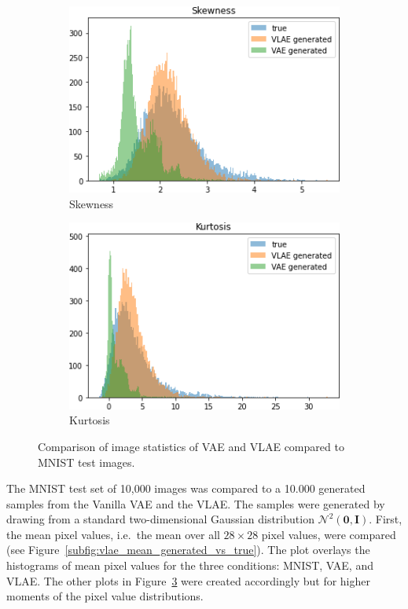 \begin{figure}
\begin{subfigure}{0.4\textwidth}
        \includegraphics[width=\textwidth]{images/vlae_generated_vs_true/mnist_vs_vlae_skew.png}
        \caption{Skewness}
        \label{subfig:vae_skew_generated_vs_true}
    \end{subfigure}
    \hfill
    \begin{subfigure}{0.4\textwidth}
        \centering
        \includegraphics[width=\textwidth]{images/vlae_generated_vs_true/mnist_vs_vlae_kurt.png}
        \caption{Kurtosis}
        \label{subfig:vae_kurt_generated_vs_true}
    \end{subfigure}
    \caption{Comparison of image statistics of \ac{VAE} and \ac{VLAE} compared to \textsc{MNIST} test images. }
    \label{fig:mean_generated_vs_true}
\end{figure}


The MNIST test set of 10,000 images was compared to a 10.000 generated samples from the Vanilla \ac{VAE} and the \ac{VLAE}.
The samples were generated by drawing from a standard two-dimensional Gaussian distribution $\mathcal{N}^2(\bm{0},\bm{I})$.
First, the mean pixel values, i.e.~the mean over all $28\times 28$ pixel values, were compared (see Figure~\ref{subfig:vlae_mean_generated_vs_true}).
The plot overlays the histograms of mean pixel values for the three conditions: \textsc{MNIST}, \ac{VAE}, and \ac{VLAE}.
The other plots in Figure~\ref{fig:mean_generated_vs_true} were created accordingly but for higher moments of the pixel value distributions.

